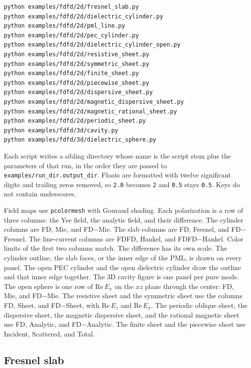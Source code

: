 \documentclass[11pt,a4paper]{article}
\begin{document}
\begin{verbatim}
python examples/fdfd/2d/fresnel_slab.py
python examples/fdfd/2d/dielectric_cylinder.py
python examples/fdfd/2d/pml_line.py
python examples/fdfd/2d/pec_cylinder.py
python examples/fdfd/2d/dielectric_cylinder_open.py
python examples/fdfd/2d/resistive_sheet.py
python examples/fdfd/2d/symmetric_sheet.py
python examples/fdfd/2d/finite_sheet.py
python examples/fdfd/2d/piecewise_sheet.py
python examples/fdfd/2d/dispersive_sheet.py
python examples/fdfd/2d/magnetic_dispersive_sheet.py
python examples/fdfd/2d/magnetic_rational_sheet.py
python examples/fdfd/2d/periodic_sheet.py
python examples/fdfd/3d/cavity.py
python examples/fdfd/3d/dielectric_sphere.py
\end{verbatim}

Each script writes a sibling directory whose name is the script stem plus
the parameters of that run, in the order they are passed to
\texttt{examples/run\_dir.output\_dir}. Floats are formatted with twelve
significant digits and trailing zeros removed, so \texttt{2.0} becomes
\texttt{2} and \texttt{0.5} stays \texttt{0.5}. Keys do not contain
underscores.

Field maps use \texttt{pcolormesh} with Gouraud shading. Each polarization
is a row of three columns: the Yee field, the analytic field, and their
difference. The cylinder columns are FD, Mie, and FD$-$Mie. The slab
columns are FD, Fresnel, and FD$-$Fresnel. The line-current columns are
FDFD, Hankel, and FDFD$-$Hankel. Color limits of the first two
columns match. The difference has its own scale. The cylinder outline, the
slab faces, or the inner edge of the PML, is drawn on every panel. The open
PEC cylinder and the open dielectric cylinder draw the outline and that
inner edge together. The 3D cavity figure is one panel per pure mode.
The open sphere is one row of $\mathrm{Re}\,E_x$ on the $xz$ plane
through the center: FD, Mie, and FD$-$Mie. The resistive sheet and the symmetric sheet use the columns FD, Sheet,
and FD$-$Sheet, with $\mathrm{Re}\,E_z$ and $\mathrm{Re}\,E_x$. The periodic
oblique sheet, the dispersive sheet, the magnetic dispersive sheet, and
the rational magnetic sheet use FD, Analytic, and FD$-$Analytic. The finite sheet and
the piecewise sheet use Incident, Scattered, and Total.

\subsection{Fresnel slab}
\label{sec:ex-fresnel}
\end{document}
